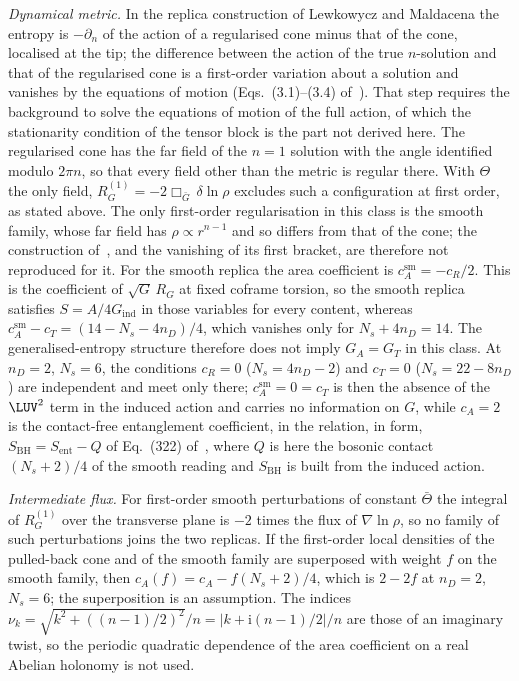 \emph{Dynamical metric.} In the replica construction of Lewkowycz and Maldacena the entropy is \(-\partial_n\) of the action of a regularised cone minus that of the cone, localised at the tip; the difference between the action of the true \(n\)-solution and that of the regularised cone is a first-order variation about a solution and vanishes by the equations of motion (Eqs.~(3.1)--(3.4) of~\cite{LewkowyczMaldacena2013}). That step requires the background to solve the equations of motion of the full action, of which the stationarity condition of the tensor block is the part not derived here. The regularised cone has the far field of the \(n=1\) solution with the angle identified modulo \(2\pi n\), so that every field other than the metric is regular there. With \(\Theta\) the only field, \(R_G^{(1)}=-2\Box_{\bar G}\,\delta\ln\rho\) excludes such a configuration at first order, as stated above. The only first-order regularisation in this class is the smooth family, whose far field has \(\rho\propto r^{n-1}\) and so differs from that of the cone; the construction of~\cite{LewkowyczMaldacena2013}, and the vanishing of its first bracket, are therefore not reproduced for it. For the smooth replica the area coefficient is \(c_A^{\mathrm{sm}}=-c_R/2\). This is the coefficient of \(\sqrt G\,R_G\) at fixed coframe torsion, so the smooth replica satisfies \(S=A/4G_{\mathrm{ind}}\) in those variables for every content, whereas \(c_A^{\mathrm{sm}}-c_T=(14-N_s-4n_D)/4\), which vanishes only for \(N_s+4n_D=14\). The generalised-entropy structure therefore does not imply \(G_A=G_T\) in this class. At \(n_D=2\), \(N_s=6\), the conditions \(c_R=0\) (\(N_s=4n_D-2\)) and \(c_T=0\) (\(N_s=22-8n_D\)) are independent and meet only there; \(c_A^{\mathrm{sm}}=0=c_T\) is then the absence of the \(\LUV^2\) term in the induced action and carries no information on \(G\), while \(c_A=2\) is the contact-free entanglement coefficient, in the relation, in form, \(S_{\mathrm{BH}}=S_{\mathrm{ent}}-Q\) of Eq.~(322) of~\cite{Solodukhin2011}, where \(Q\) is here the bosonic contact \((N_s+2)/4\) of the smooth reading and \(S_{\mathrm{BH}}\) is built from the induced action.



\emph{Intermediate flux.} For first-order smooth perturbations of constant \(\bar\Theta\) the integral of \(R_G^{(1)}\) over the transverse plane is \(-2\) times the flux of \(\nabla\ln\rho\), so no family of such perturbations joins the two replicas. If the first-order local densities of the pulled-back cone and of the smooth family are superposed with weight \(f\) on the smooth family, then \(c_A(f)=c_A-f(N_s+2)/4\), which is \(2-2f\) at \(n_D=2\), \(N_s=6\); the superposition is an assumption. The indices \(\nu_k=\sqrt{k^2+((n-1)/2)^2}/n=|k+\mathrm i(n-1)/2|/n\) are those of an imaginary twist, so the periodic quadratic dependence of the area coefficient on a real Abelian holonomy is not used.



